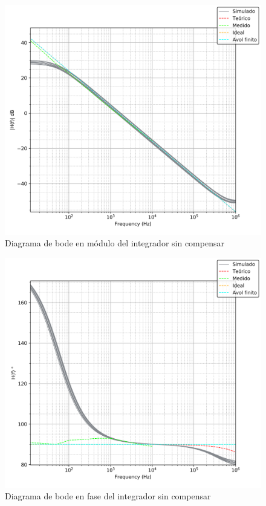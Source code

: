 \begin{figure}[H]
	\centering
	\includegraphics[scale=0.6]{Recursos/Integrador/bode_modulo.png}
	\caption{Diagrama de bode en m\'odulo del integrador sin compensar}
	\label{fig:integrador_bode_modulo}
\end{figure}

\begin{figure}[H]
	\centering
	\includegraphics[scale=0.6]{Recursos/Integrador/bode_fase.png}
	\caption{Diagrama de bode en fase del integrador sin compensar}
	\label{fig:integrador_bode_fase}
\end{figure}

